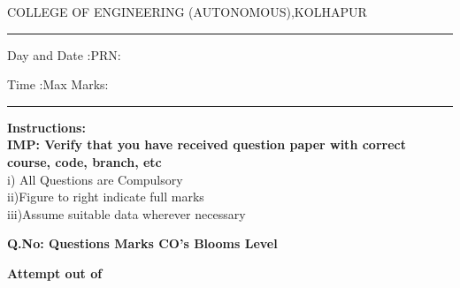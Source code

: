 \documentclass[12pt]{article}
\begin{document}
	
\par
COLLEGE OF ENGINEERING (AUTONOMOUS),KOLHAPUR
\par\noindent\rule{\textwidth}{0.4pt}
\par
{}\par
{}\par
\begin{flushleft}
Day and Date :{}\hspace{3.5cm}PRN:
\end{flushleft}

\begin{flushleft}
Time :{}\hspace{3cm}Max Marks:{}\\
\end{flushleft}
\noindent\rule{\textwidth}{0.1pt}
\begin{flushleft}
{\bf Instructions:}\\
{\hspace{0.5cm} \bf IMP: Verify that you have received question paper with correct course, code, branch, etc}\\
\hspace{1cm}i) All Questions are Compulsory\\
\hspace{1cm}ii)Figure to right indicate full marks\\
\hspace{1cm}iii)Assume suitable data wherever necessary\\
\end{flushleft} 

\begin{flushleft}
{\bf Q.No: \hspace{2.5cm} \bf Questions \hspace{0.25cm} \bf Marks \hspace{0.25cm} \bf CO's\hspace{0.25cm} \bf Blooms Level}	
\end{flushleft}

\begin{flushleft}
\bf {} \hspace{2cm} Attempt  out of \\  
\end{flushleft}	
\begin{flushleft}
 {}\hspace{2cm}
 \hspace{1cm}   \hspace{1cm}  \hspace{1cm} \par
\end{flushleft}	



	
	
\end{document}
